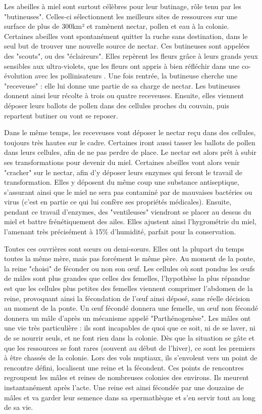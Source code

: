 			
			Les abeilles à miel sont surtout célèbres pour leur butinage, rôle tenu par les "butineuses". Celles-ci sélectionnent les meilleurs sites de ressources sur une surface de plus de 300km² \cite{riviere_modemulti-agent_2021} et ramènent nectar, pollen et eau à la colonie. Certaines abeilles vont spontanément quitter la ruche sans destination, dans le seul but de trouver une nouvelle source de nectar. Ces butineuses sont appelées des "scouts", ou des "éclaireurs". Elles repèrent les fleurs grâce à leurs grands yeux sensibles aux ultra-violets, que les fleurs ont appris à bien réfléchir dans une co-évolution avec les pollinisateurs \cite{thompson_concepts_1989}. Une fois rentrée, la butineuse cherche une "receveuse" : elle lui donne une partie de sa charge de nectar. Les butineuses donnent ainsi leur récolte à trois ou quatre receveuses. Ensuite, elles viennent déposer leurs ballots de pollen dans des cellules proches du couvain, puis repartent butiner ou vont se reposer. 
			
			Dans le même temps, les receveuses vont déposer le nectar reçu dans des cellules, toujours très hautes sur le cadre. Certaines iront aussi tasser les ballots de pollen dans leurs cellules, afin de ne pas perdre de place. Le nectar est alors prêt à subir ses transformations pour devenir du miel. Certaines abeilles vont alors venir "cracher" sur le nectar, afin d'y déposer leurs enzymes qui feront le travail de transformation. Elles y déposent du même coup une substance antiseptique, s'assurant ainsi que le miel ne sera pas contaminé par de mauvaises bactéries ou virus (c'est en partie ce qui lui confère ses propriétés médicales). Ensuite, pendant ce travail d'enzymes, des "ventileuses" viendront se placer au dessus du miel et battre frénétiquement des ailes. Elles ajustent ainsi l'hygrométrie du miel, l'amenant très précisément à 15\% d'humidité, parfait pour la conservation.
			
			Toutes ces ouvrières sont sœurs ou demi-sœurs. Elles ont la plupart du temps toutes la même mère, mais pas forcément le même père. Au moment de la ponte, la reine "choisi" de féconder ou non son œuf. Les cellules où sont pondus les œufs de mâles sont plus grandes que celles des femelles, l'hypothèse la plus répandue est que les cellules plus petites des femelles viennent comprimer l'abdomen de la reine, provoquant ainsi la fécondation de l'œuf ainsi déposé, sans réelle décision au moment de la ponte. Un œuf fécondé donnera une femelle, un œuf non fécondé donnera un mâle d'après un mécanisme appelé "Parthénogenèse". 
			Les mâles ont une vie très particulière : ils sont incapables de quoi que ce soit, ni de se laver, ni de se nourrir seuls, et ne font rien dans la colonie. Dès que la situation se gâte et que les ressources se font rares (souvent au début de l'hiver), ce sont les premiers à être chassés de la colonie. Lors des vols nuptiaux, ils s'envolent vers un point de rencontre défini, localisent une reine et la fécondent. Ces points de rencontres regroupent les mâles et reines de nombreuses colonies des environs. Ils meurent instantanément après l'acte. Une reine est ainsi fécondée par une douzaine de mâles et va garder leur semence dans sa spermathèque et s'en servir tout au long de sa vie.
			
